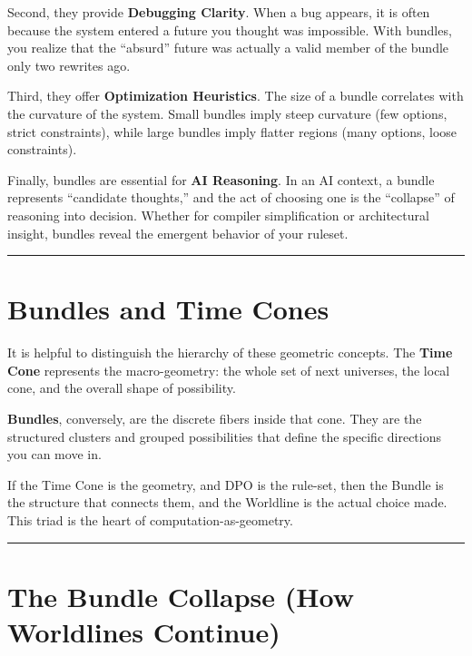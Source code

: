 Second, they provide \textbf{Debugging Clarity}. When a bug appears, it is often because the system entered a future you thought was impossible. With bundles, you realize that the ``absurd'' future was actually a valid member of the bundle only two rewrites ago.

Third, they offer \textbf{Optimization Heuristics}. The size of a bundle correlates with the curvature of the system. Small bundles imply steep curvature (few options, strict constraints), while large bundles imply flatter regions (many options, loose constraints).

Finally, bundles are essential for \textbf{AI Reasoning}. In an AI context, a bundle represents ``candidate thoughts,'' and the act of choosing one is the ``collapse'' of reasoning into decision. Whether for compiler simplification or architectural insight, bundles reveal the emergent behavior of your ruleset.

\begin{center}\rule{0.5\linewidth}{0.5pt}\end{center}

\section{\texorpdfstring{\textbf{Bundles and Time Cones}}{11.6 --- Bundles and Time Cones}}

It is helpful to distinguish the hierarchy of these geometric concepts. The \textbf{Time Cone} represents the macro-geometry: the whole set of next universes, the local cone, and the overall shape of possibility.

\textbf{Bundles}, conversely, are the discrete fibers inside that cone. They are the structured clusters and grouped possibilities that define the specific directions you can move in.

If the Time Cone is the geometry, and DPO is the rule-set, then the Bundle is the structure that connects them, and the Worldline is the actual choice made. This triad is the heart of computation-as-geometry.

\begin{center}\rule{0.5\linewidth}{0.5pt}\end{center}

\section{\texorpdfstring{\textbf{The Bundle Collapse (How Worldlines Continue)}}{11.7 --- The Bundle Collapse (How Worldlines Continue)}}

